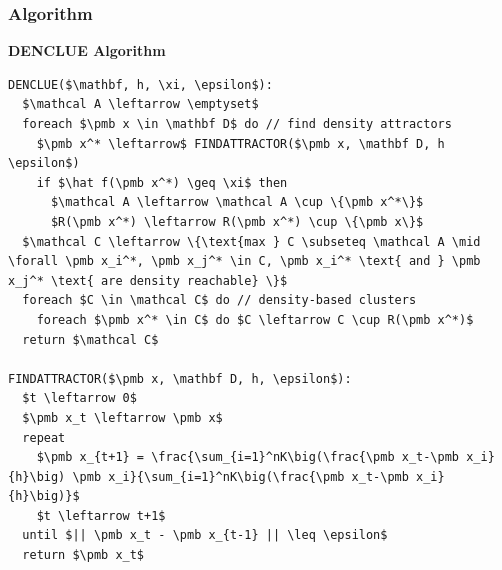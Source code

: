 \documentclass[a4, english]{article}
\begin{document}
\subsubsection{Algorithm}
\begin{framed}  
\begin{center}  
  \textbf{DENCLUE Algorithm}  
\end{center}
\begin{lstlisting}[mathescape=true, keywordstyle=\ttfamily]
DENCLUE($\mathbf, h, \xi, \epsilon$):
  $\mathcal A \leftarrow \emptyset$ 
  foreach $\pmb x \in \mathbf D$ do // find density attractors 
    $\pmb x^* \leftarrow$ FINDATTRACTOR($\pmb x, \mathbf D, h \epsilon$)
    if $\hat f(\pmb x^*) \geq \xi$ then 
      $\mathcal A \leftarrow \mathcal A \cup \{\pmb x^*\}$ 
      $R(\pmb x^*) \leftarrow R(\pmb x^*) \cup \{\pmb x\}$
  $\mathcal C \leftarrow \{\text{max } C \subseteq \mathcal A \mid \forall \pmb x_i^*, \pmb x_j^* \in C, \pmb x_i^* \text{ and } \pmb x_j^* \text{ are density reachable} \}$ 
  foreach $C \in \mathcal C$ do // density-based clusters
    foreach $\pmb x^* \in C$ do $C \leftarrow C \cup R(\pmb x^*)$ 
  return $\mathcal C$ 
  
FINDATTRACTOR($\pmb x, \mathbf D, h, \epsilon$):
  $t \leftarrow 0$ 
  $\pmb x_t \leftarrow \pmb x$ 
  repeat
    $\pmb x_{t+1} = \frac{\sum_{i=1}^nK\big(\frac{\pmb x_t-\pmb x_i}{h}\big) \pmb x_i}{\sum_{i=1}^nK\big(\frac{\pmb x_t-\pmb x_i}{h}\big)}$ 
    $t \leftarrow t+1$
  until $|| \pmb x_t - \pmb x_{t-1} || \leq \epsilon$
  return $\pmb x_t$  
\end{lstlisting}
\end{framed}
\end{document}
